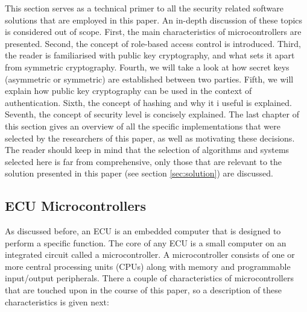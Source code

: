 \documentclass[11pt]{article}
\begin{document}
This section serves as a technical primer to all the security related software solutions that are employed in this paper. An in-depth discussion of these topics is considered out of scope. First, the main characteristics of microcontrollers are presented. Second, the concept of role-based access control is introduced. Third, the reader is familiarised with public key cryptography, and what sets it apart from symmetric cryptography. Fourth, we will take a look at how secret keys (asymmetric or symmetric) are established between two parties. Fifth, we will explain how public key cryptography can be used in the context of authentication. Sixth, the concept of hashing and why it i useful is explained. Seventh, the concept of security level is concisely explained. The last chapter of this section gives an overview of all the specific implementations that were selected by the researchers of this paper, as well as motivating these decisions. The reader should keep in mind that the selection of algorithms and systems selected here is far from comprehensive, only those that are relevant to the solution presented in this paper (see section \ref{sec:solution}) are discussed. 


\subsection{ECU Microcontrollers}
As discussed before, an ECU is an embedded computer that is designed to perform a specific function. The core of any ECU is a small computer on an integrated circuit called a microcontroller. A microcontroller consists of one or more central processing units (CPUs)  along with memory and programmable input/output peripherals. There a couple of characteristics of microcontrollers that are touched upon in the course of this paper, so a description of these characteristics is given next:
\end{document}
